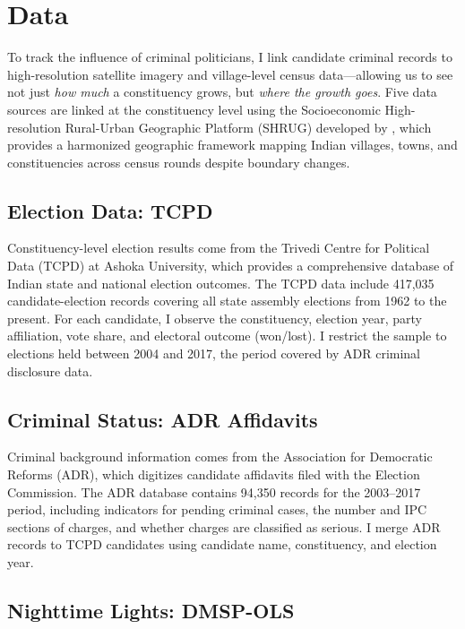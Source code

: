 \documentclass[12pt]{article}
\begin{document}
\section{Data}

To track the influence of criminal politicians, I link candidate criminal records to high-resolution satellite imagery and village-level census data---allowing us to see not just \textit{how much} a constituency grows, but \textit{where the growth goes}. Five data sources are linked at the constituency level using the Socioeconomic High-resolution Rural-Urban Geographic Platform (SHRUG) developed by \citet{asher2021shrug}, which provides a harmonized geographic framework mapping Indian villages, towns, and constituencies across census rounds despite boundary changes.

\subsection{Election Data: TCPD}

Constituency-level election results come from the Trivedi Centre for Political Data (TCPD) at Ashoka University, which provides a comprehensive database of Indian state and national election outcomes. The TCPD data include 417,035 candidate-election records covering all state assembly elections from 1962 to the present. For each candidate, I observe the constituency, election year, party affiliation, vote share, and electoral outcome (won/lost). I restrict the sample to elections held between 2004 and 2017, the period covered by ADR criminal disclosure data.

\subsection{Criminal Status: ADR Affidavits}

Criminal background information comes from the Association for Democratic Reforms (ADR), which digitizes candidate affidavits filed with the Election Commission. The ADR database contains 94,350 records for the 2003--2017 period, including indicators for pending criminal cases, the number and IPC sections of charges, and whether charges are classified as serious. I merge ADR records to TCPD candidates using candidate name, constituency, and election year.

\subsection{Nighttime Lights: DMSP-OLS}
\end{document}
